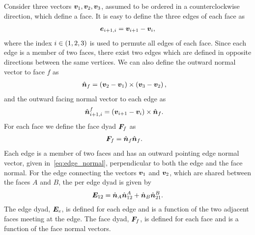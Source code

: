 \documentclass[]{aiaa-tc}%
\begin{document}
Consider three vectors \( \bm{v}_1, \bm{v}_2, \bm{v}_3 \), assumed to be ordered in a counterclockwise direction, which define a face.
It is easy to define the three edges of each face as
\begin{align}\label{eq:edges}
    \bm{e}_{i+1,i} = \bm{v}_{i+1} - \bm{v}_i ,
\end{align}
where the index \( i \in \left( 1,2,3 \right) \) is used to permute all edges of each face.
Since each edge is a member of two faces, there exist two edges which are defined in opposite directions between the same vertices.
We can also define the outward normal vector to face \( f\)  as
\begin{align}\label{eq:face_normal}
    \hat{\bm{n}}_f &= \left( \bm{v}_{2} - \bm{v}_1 \right) \times \left( \bm{v}_{3} - \bm{v}_2 \right) ,
\end{align}
and the outward facing normal vector to each edge as
\begin{align}\label{eq:edge_normal}
    \hat{\bm{n}}_{i+1,i}^f &= \left( \bm{v}_{i+1} - \bm{v}_i \right) \times \hat{\bm{n}}_f .
\end{align}
For each face we define the face dyad \( \bm{F}_f \) as
\begin{align}\label{eq:face_dyad}
    \bm{F}_f &= \hat{\bm{n}}_f \hat{\bm{n}}_f .
\end{align}
Each edge is a member of two faces and has an outward pointing edge normal vector, given in~\cref{eq:edge_normal}, perpendicular to both the edge and the face normal.
For the edge connecting the vectors \( \bm{v}_1 \) and \( \bm{v}_2 \), which are shared between the faces \(A\) and \( B\), the per edge dyad is given by
\begin{align}\label{eq:edge_dyad}
    \bm{E}_{12} = \hat{\bm{n}}_A \hat{\bm{n}}_{12}^A + \hat{\bm{n}}_B \hat{\bm{n}}_{21}^B .
\end{align}
The edge dyad, \( \bm{E}_e \), is defined for each edge and is a function of the two adjacent faces meeting at the edge.
The face dyad, \( \bm{F}_f \), is defined for each face and is a function of the face normal vectors.
\end{document}
